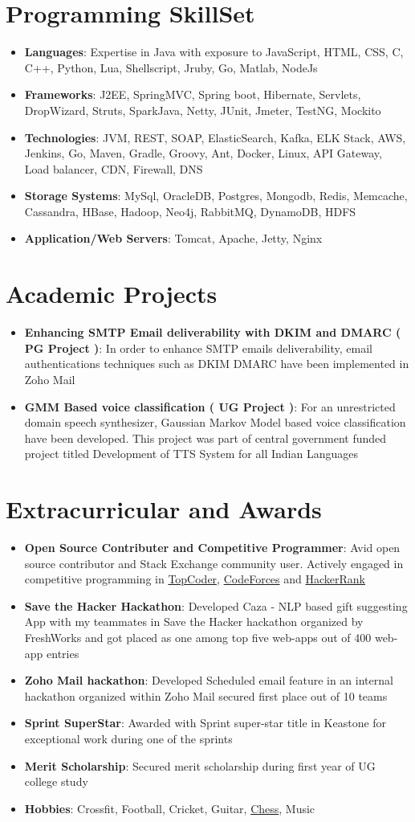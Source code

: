 \documentclass[letterpaper,11pt]{article}
\newcommand{\resumeItem}[2]{
  \item\small{
    \textbf{#1}{: #2 \vspace{-2pt}}
  }
}
\newcommand{\resumeSubItem}[2]{\resumeItem{#1}{#2}\vspace{-4pt}}
\newcommand{\resumeSubHeadingListStart}{\begin{itemize}[leftmargin=*]}
\newcommand{\resumeSubHeadingListEnd}{\end{itemize}}
\begin{document}
\section{Programming SkillSet}
  \resumeSubHeadingListStart
    \resumeSubItem{Languages}{Expertise in Java with exposure to JavaScript, HTML, CSS, C, C++, Python, Lua, Shellscript, Jruby, Go, Matlab, NodeJs}
    \resumeSubItem{Frameworks}{J2EE, SpringMVC, Spring boot, Hibernate, Servlets, DropWizard, Struts, SparkJava, Netty, JUnit, Jmeter, TestNG, Mockito}
    \resumeSubItem{Technologies}{JVM, REST, SOAP, ElasticSearch, Kafka, ELK Stack, AWS, Jenkins, Go, Maven, Gradle, Groovy, Ant, Docker, Linux, API Gateway, Load balancer, CDN, Firewall, DNS}
    \resumeSubItem{Storage Systems}{MySql, OracleDB, Postgres, Mongodb, Redis, Memcache, Cassandra, HBase, Hadoop, Neo4j, RabbitMQ, DynamoDB, HDFS}
     \resumeSubItem{Application/Web Servers}{Tomcat, Apache, Jetty, Nginx}
     
  \resumeSubHeadingListEnd


\section{Academic Projects}
  \resumeSubHeadingListStart
    \resumeSubItem{Enhancing SMTP Email deliverability with DKIM and DMARC ( PG Project )}
      {In order to enhance SMTP
emails deliverability, email authentications techniques such as DKIM DMARC have been implemented in Zoho Mail}
    \resumeSubItem{GMM Based voice classification ( UG Project )}
      {For an unrestricted domain speech synthesizer, Gaussian Markov
Model based voice classification have been developed. This project was part of central government funded project titled
Development of TTS System for all Indian Languages}


  \resumeSubHeadingListEnd


\section{Extracurricular and Awards}
  \resumeSubHeadingListStart
    \resumeSubItem{Open Source Contributer and Competitive Programmer}
      {Avid open source contributor and Stack Exchange community user. Actively engaged in competitive programming in \href{}{TopCoder}, \href{}{CodeForces} and \href{}{HackerRank}}
    \resumeSubItem{Save the Hacker Hackathon}
      {Developed Caza - NLP based gift suggesting App with my teammates in Save the
Hacker hackathon organized by FreshWorks and got placed as one among top five web-apps out of 400 web-app entries}
    \resumeSubItem{Zoho Mail hackathon}
      {Developed Scheduled email feature in an internal hackathon organized within Zoho Mail secured first place out of 10 teams}
    \resumeSubItem{Sprint SuperStar}
      {Awarded with Sprint super-star title in Keastone for exceptional work during one of the sprints}
    \resumeSubItem{Merit Scholarship}
      {Secured merit scholarship during first year of UG college study}
      \resumeSubItem{Hobbies}
      {Crossfit, Football, Cricket, Guitar, {\href{https://www.chess.com/member/aarish24}{Chess}}, Music}
  \resumeSubHeadingListEnd

\end{document}
